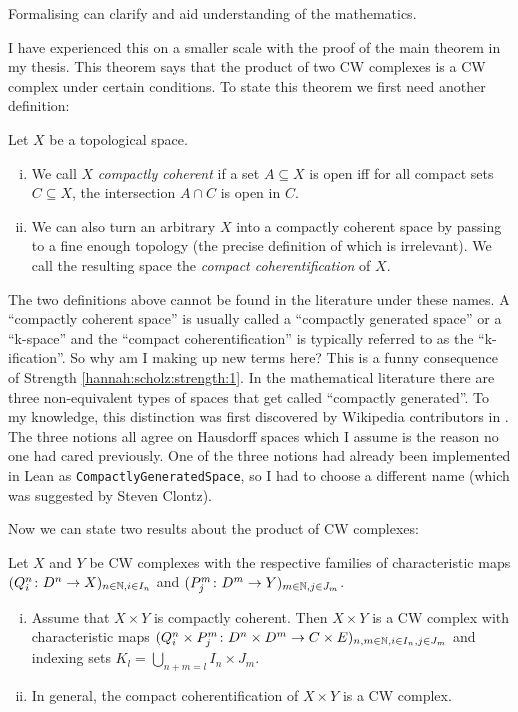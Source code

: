 \begin{strength}
Formalising can clarify and aid understanding of the mathematics.
\end{strength}

I have experienced this on a smaller scale with the proof of the main theorem in my thesis. This theorem says that the product of two CW complexes is a CW complex under certain conditions. To state this theorem we first need another definition: 

\begin{definition}
Let $X$ be a topological space. 
\begin{enumerate}[(i)]
    \item We call $X$ \emph{compactly coherent} if a set $A \subseteq X$ is open iff for all compact sets $C \subseteq X$, the intersection $A \cap C$ is open in $C$.
    \item We can also turn an arbitrary $X$ into a compactly coherent space by passing to a fine enough topology (the precise definition of which is irrelevant). We call the resulting space the \emph{compact coherentification} of $X$. 
\end{enumerate} 
\end{definition}

The two definitions above cannot be found in the literature under these names. A ``compactly coherent space'' is usually called a ``compactly generated space'' or a ``k-space'' and the ``compact coherentification'' is typically referred to as the ``k-ification''. So why am I making up new terms here? This is a funny consequence of Strength \ref{hannah:scholz:strength:1}. In the mathematical literature there are three non-equivalent types of spaces that get called ``compactly generated''. To my knowledge, this distinction was first discovered by Wikipedia contributors in \cite{CompactlyCoherent}. The three notions all agree on Hausdorff spaces which I assume is the reason no one had cared previously. One of the three notions had already been implemented in Lean as \lstinline[language=lean]|CompactlyGeneratedSpace|, so I had to choose a different name (which was suggested by Steven Clontz). 

Now we can state two results about the product of CW complexes: 

\begin{theorem}
Let $X$ and $Y$ be CW complexes with the respective families of characteristic maps $(Q_i^n \colon D^n \to X)_{n \in \mathbb N, i \in I_n}$ and $(P_j^m \colon D^m \to Y)_{m \in \mathbb N, j \in J_m}$. 
\begin{enumerate}[(i)]
    \item Assume that $X \times Y$ is compactly coherent. Then $X \times Y$ is a CW complex with characteristic maps $(Q_i^n \times P_j^m \colon D^n \times D^m \to C \times E)_{n,m \in \mathbb N,i \in I_n,j \in J_m}$ and indexing sets $K_l = \bigcup_{n + m = l}I_n \times J_m$.
    \item In general, the compact coherentification of $X \times Y$ is a CW complex. 
\end{enumerate}
\end{theorem}

